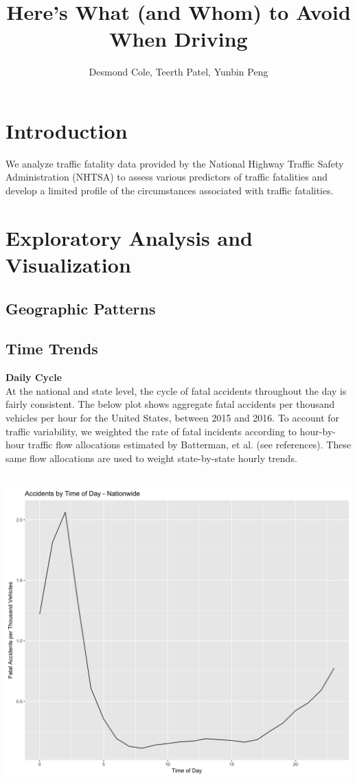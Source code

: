 \documentclass[11pt, oneside]{article}   	%
\title{Here's What (and Whom) to Avoid When Driving}
\author{Desmond Cole, Teerth Patel, Yunbin Peng}
\begin{document}
\maketitle
\section*{Introduction}
We analyze traffic fatality data provided by the National Highway Traffic Safety Administration (NHTSA) to assess various predictors of traffic fatalities and develop a limited profile of the circumstances associated with traffic fatalities.

\section*{Exploratory Analysis and Visualization}

\subsection*{Geographic Patterns}

\subsection*{Time Trends}
\textbf{Daily Cycle} \\
At the national and state level, the cycle of fatal accidents throughout the day is fairly consistent. The below plot shows aggregate fatal accidents per thousand vehicles per hour for the United States, between 2015 and 2016. To account for traffic variability, we weighted the rate of fatal incidents according to hour-by-hour traffic flow allocations estimated by Batterman, et al. (see references). These same flow allocations are used to weight state-by-state hourly trends. \\
\\
\begin{center}
\includegraphics[width=.75\textwidth]{WeightedNationalDayTrends.png}
\end{center}
\end{document}

